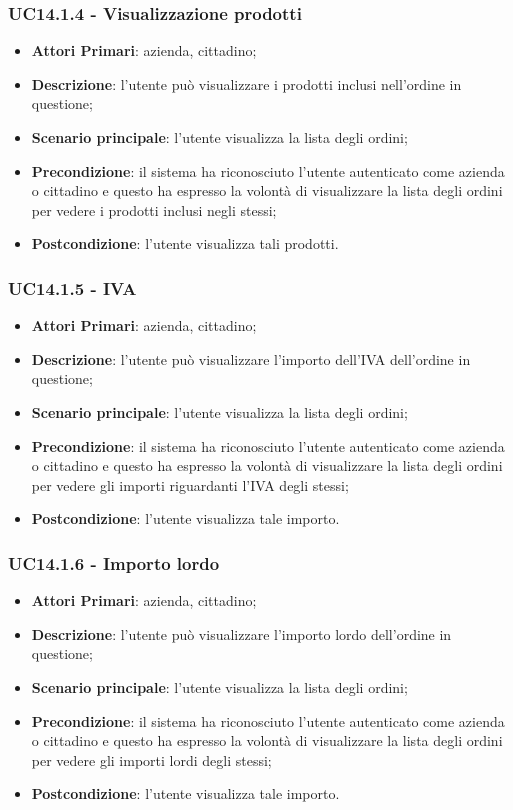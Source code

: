\subsubsection{UC14.1.4 - Visualizzazione prodotti}
\begin{itemize}
	\item \textbf{Attori Primari}: azienda, cittadino;
	\item \textbf{Descrizione}: l'utente può visualizzare i prodotti inclusi nell'ordine in questione;
	\item \textbf{Scenario principale}: l'utente visualizza la lista degli ordini;
	\item \textbf{Precondizione}: il sistema ha riconosciuto l'utente autenticato come azienda o cittadino e questo ha espresso la volontà di visualizzare la lista degli ordini per vedere i prodotti inclusi negli stessi;
	\item \textbf{Postcondizione}: l'utente visualizza tali prodotti.
\end{itemize}

\subsubsection{UC14.1.5 - IVA}
\begin{itemize}
	\item \textbf{Attori Primari}: azienda, cittadino;
	\item \textbf{Descrizione}: l'utente può visualizzare l'importo dell'IVA dell'ordine in questione;
	\item \textbf{Scenario principale}: l'utente visualizza la lista degli ordini;
	\item \textbf{Precondizione}: il sistema ha riconosciuto l'utente autenticato come azienda o cittadino e questo ha espresso la volontà di visualizzare la lista degli ordini per vedere gli importi riguardanti l'IVA degli stessi;
	\item \textbf{Postcondizione}: l'utente visualizza tale importo.
\end{itemize}

\subsubsection{UC14.1.6 - Importo lordo}
\begin{itemize}
	\item \textbf{Attori Primari}: azienda, cittadino;
	\item \textbf{Descrizione}: l'utente può visualizzare l'importo lordo dell'ordine in questione;
	\item \textbf{Scenario principale}: l'utente visualizza la lista degli ordini;
	\item \textbf{Precondizione}: il sistema ha riconosciuto l'utente autenticato come azienda o cittadino e questo ha espresso la volontà di visualizzare la lista degli ordini per vedere gli importi lordi degli stessi;
	\item \textbf{Postcondizione}: l'utente visualizza tale importo.
\end{itemize}

